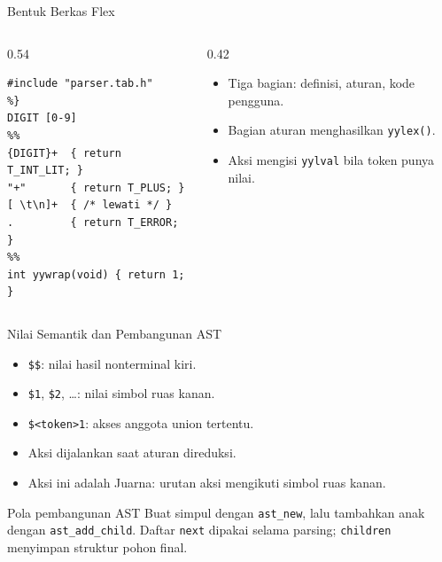 \documentclass[aspectratio=169,10pt,t]{beamer}
\begin{document}
\begin{frame}[fragile]{Bentuk Berkas Flex}
  \begin{columns}[T,onlytextwidth]
    \begin{column}{0.54\textwidth}
      \begin{lstlisting}[language=Flex,basicstyle=\ttfamily\scriptsize]
%{
#include "parser.tab.h"
%}
DIGIT [0-9]
%%
{DIGIT}+  { return T_INT_LIT; }
"+"       { return T_PLUS; }
[ \t\n]+  { /* lewati */ }
.         { return T_ERROR; }
%%
int yywrap(void) { return 1; }
      \end{lstlisting}
    \end{column}
    \begin{column}{0.42\textwidth}
      \begin{itemize}
        \item Tiga bagian: definisi, aturan, kode pengguna.
        \item Bagian aturan menghasilkan \texttt{yylex()}.
        \item Aksi mengisi \texttt{yylval} bila token punya nilai.
      \end{itemize}
    \end{column}
  \end{columns}
\end{frame}

\begin{frame}{Nilai Semantik dan Pembangunan AST}
  \begin{itemize}
    \item \texttt{\$\$}: nilai hasil nonterminal kiri.
    \item \texttt{\$1}, \texttt{\$2}, \ldots: nilai simbol ruas kanan.
    \item \texttt{\$<token>1}: akses anggota union tertentu.
    \item Aksi dijalankan saat aturan direduksi.
    \item Aksi ini adalah  Juarna: urutan aksi
          mengikuti simbol ruas kanan.
  \end{itemize}

  \vspace{5pt}
  \begin{block}{Pola pembangunan AST}
    \footnotesize
    Buat simpul dengan \texttt{ast\_new}, lalu tambahkan anak dengan
    \texttt{ast\_add\_child}. Daftar \texttt{next} dipakai selama
    parsing; \texttt{children} menyimpan struktur pohon final.
  \end{block}
\end{frame}
\end{document}
